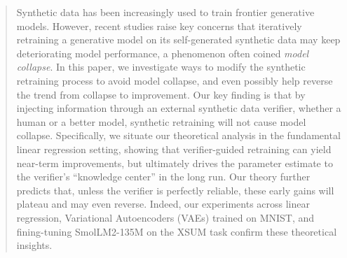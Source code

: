 \begin{abstract}

   Synthetic data has been increasingly used to train frontier generative models. However, recent studies raise key concerns that iteratively retraining a generative model on its self-generated synthetic data may keep deteriorating model performance, a phenomenon often coined \emph{model collapse}. In this paper, we investigate ways to modify the synthetic retraining process to avoid model collapse, and even possibly help reverse the trend from collapse to improvement. Our key finding is that by injecting information through an external synthetic data verifier, whether a human or  a better model, synthetic retraining will not cause model collapse.
   Specifically, we situate our theoretical analysis in the fundamental linear regression setting, showing that verifier-guided retraining can yield near-term improvements, but ultimately drives the parameter estimate to the verifier's “knowledge center” in the long run. Our theory further predicts that, unless the verifier is perfectly reliable, these early gains will plateau and may even reverse. Indeed, our experiments across linear regression, Variational Autoencoders (VAEs) trained on MNIST, and fining-tuning SmolLM2-135M on the XSUM task confirm these theoretical insights.

\end{abstract}